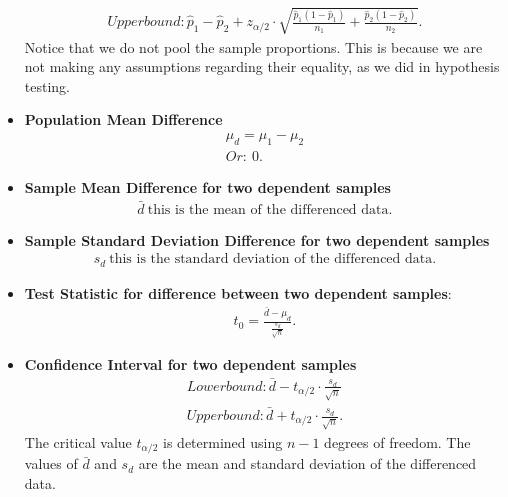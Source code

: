 \documentclass{report}
\begin{document}
\begin{itemize}
\begin{align*}
              Upper bound: \hat{p}_1 - \hat{p}_2 + z_{\alpha/2} \cdot \sqrt{\frac{\hat{p}_1(1 - \hat{p}_1)}{n_1} + \frac{\hat{p}_2(1 - \hat{p}_2)}{n_2}}
          .\end{align*}
          Notice that we do not pool the sample proportions. This is because we are not making any assumptions regarding their equality, as we did in hypothesis testing.
        \item \textbf{Population Mean Difference} 
            \begin{align*}
                \mu_{d} = \mu_{1} - \mu_{2} \\
                Or:\ 0
            .\end{align*}
        \item \textbf{Sample Mean Difference for two dependent samples}
            \begin{align*}
              \bar{d}\ \text{this is the mean of the differenced  data}
            .\end{align*}
        \item \textbf{Sample Standard Deviation Difference for two dependent samples}
            \begin{align*}
                s_{d}\ \text{this is the standard deviation of the differenced  data}
            .\end{align*}
          \item \textbf{Test Statistic for difference between two dependent samples}:
            \begin{align*}
                t_{0} = \frac{\bar{d}-\mu_{d}}{\frac{s_{d}}{\sqrt{n}}}
            .\end{align*}
            \bigbreak \noindent 
          \item \textbf{Confidence Interval for two dependent samples}
            \begin{align*}
                Lower bound: \bar{d} - t_{\alpha/2} \cdot \frac{s_d}{\sqrt{n}} \\
                Upper bound: \bar{d} + t_{\alpha/2} \cdot \frac{s_d}{\sqrt{n}}
            .\end{align*}
            \bigbreak \noindent 
            The critical value $t_{\alpha/2}$ is determined using $n-1$ degrees of freedom. The values of $\bar{d}$ and $s_d$ are the mean and standard deviation of the differenced data.
            \bigbreak \noindent 

\end{itemize}
\end{document}
